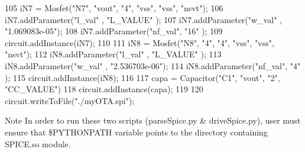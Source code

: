 \begin{DoxyCodeInclude}
105 iN7 = Mosfet(\textcolor{stringliteral}{"N7"}, \textcolor{stringliteral}{"vout"}, \textcolor{stringliteral}{"4"}, \textcolor{stringliteral}{"vss"}, \textcolor{stringliteral}{"vss"}, \textcolor{stringliteral}{"nsvt"});
106 iN7.addParameter(\textcolor{stringliteral}{"l\_val"} , \textcolor{stringliteral}{"L\_VALUE"}     );
107 iN7.addParameter(\textcolor{stringliteral}{"w\_val"} , \textcolor{stringliteral}{"1.069083e-05"});
108 iN7.addParameter(\textcolor{stringliteral}{"nf\_val"}, \textcolor{stringliteral}{"16"}          );
109 circuit.addInstance(iN7);
110 
111 iN8 = Mosfet(\textcolor{stringliteral}{"N8"}, \textcolor{stringliteral}{"4"}, \textcolor{stringliteral}{"4"}, \textcolor{stringliteral}{"vss"}, \textcolor{stringliteral}{"vss"}, \textcolor{stringliteral}{"nsvt"});
112 iN8.addParameter(\textcolor{stringliteral}{"l\_val"} , \textcolor{stringliteral}{"L\_VALUE"}     );
113 iN8.addParameter(\textcolor{stringliteral}{"w\_val"} , \textcolor{stringliteral}{"2.536703e-06"});
114 iN8.addParameter(\textcolor{stringliteral}{"nf\_val"}, \textcolor{stringliteral}{"4"}           );
115 circuit.addInstance(iN8);
116 
117 capa = Capacitor(\textcolor{stringliteral}{"C1"}, \textcolor{stringliteral}{"vout"}, \textcolor{stringliteral}{"2"}, \textcolor{stringliteral}{"CC\_VALUE"})
118 circuit.addInstance(capa);
119 
120 circuit.writeToFile(\textcolor{stringliteral}{"./myOTA.spi"});
\end{DoxyCodeInclude}


\begin{DoxyNote}{Note}
In order to run these two scripts ({\ttfamily parse\-Spice.\-py} \& drive\-Spice.\-py), user must ensure that \$\-P\-Y\-T\-H\-O\-N\-P\-A\-T\-H variable points to the directory containing S\-P\-I\-C\-E.\-so module. 
\end{DoxyNote}

